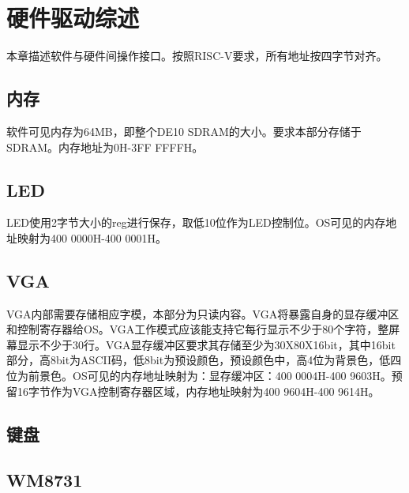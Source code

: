 %
% 
% 
% 
% 
% 
% 
%

\chapter{硬件驱动综述}
本章描述软件与硬件间操作接口。按照RISC-V要求，所有地址按四字节对齐。
\section{内存}
软件可见内存为64MB，即整个DE10 SDRAM的大小。要求本部分存储于SDRAM。内存地址为0H-3FF FFFFH。
\section{LED}
LED使用2字节大小的reg进行保存，取低10位作为LED控制位。OS可见的内存地址映射为400 0000H-400 0001H。
\section{VGA}
VGA内部需要存储相应字模，本部分为只读内容。VGA将暴露自身的显存缓冲区和控制寄存器给OS。VGA工作模式应该能支持它每行显示不少于80个字符，整屏幕显示不少于30行。VGA显存缓冲区要求其存储至少为30X80X16bit，其中16bit部分，高8bit为ASCII码，低8bit为预设颜色，预设颜色中，高4位为背景色，低四位为前景色。OS可见的内存地址映射为：显存缓冲区：400 0004H-400 9603H。预留16字节作为VGA控制寄存器区域，内存地址映射为400 9604H-400 9614H。
\section{键盘}
\section{WM8731}